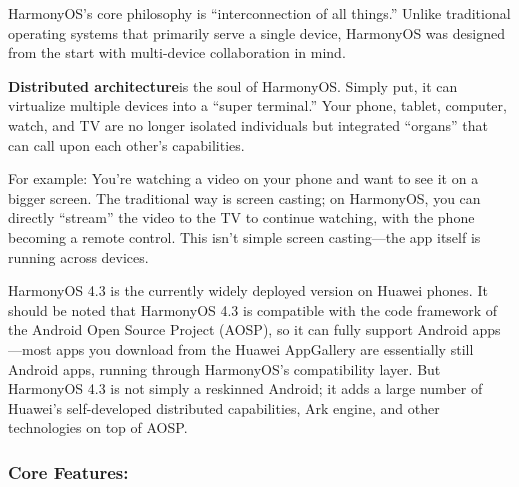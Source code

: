 


HarmonyOS's core philosophy is “interconnection of all things.” Unlike traditional operating systems that primarily serve a single device, HarmonyOS was designed from the start with multi-device collaboration in mind.

\textbf{Distributed architecture}is the soul of HarmonyOS. Simply put, it can virtualize multiple devices into a “super terminal.” Your phone, tablet, computer, watch, and TV are no longer isolated individuals but integrated “organs” that can call upon each other's capabilities.

For example: You're watching a video on your phone and want to see it on a bigger screen. The traditional way is screen casting; on HarmonyOS, you can directly “stream” the video to the TV to continue watching, with the phone becoming a remote control. This isn't simple screen casting—the app itself is running across devices.


HarmonyOS 4.3 is the currently widely deployed version on Huawei phones. It should be noted that HarmonyOS 4.3 is compatible with the code framework of the Android Open Source Project (AOSP), so it can fully support Android apps—most apps you download from the Huawei AppGallery are essentially still Android apps, running through HarmonyOS's compatibility layer. But HarmonyOS 4.3 is not simply a reskinned Android; it adds a large number of Huawei's self-developed distributed capabilities, Ark engine, and other technologies on top of AOSP.

\subsubsection*{Core Features:}

